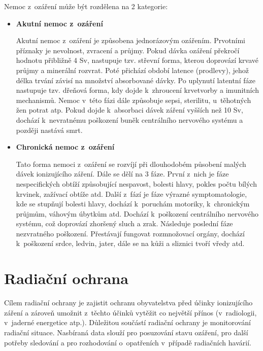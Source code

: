 Nemoc z~ozáření může být rozdělena na 2 kategorie: \cite{nemoc}

\begin{itemize}
	\item \textbf{Akutní nemoc z~ozáření}
	
		Akutní nemoc z~ozáření je způsobena jednorázovým
ozářením. Prvotními příznaky je nevolnost, zvracení a průjmy. Pokud
dávka ozáření překročí hodnotu přibližně 4 Sv, nastupuje tzv. střevní
forma, kterou doprovází krvavé průjmy a minerální rozvrat. Poté
přichází období latence (prodlevy), jehož délka trvání závisí na
množství absorbované dávky. Po uplynutí latentní fáze nastupuje
tzv. dřeňová forma, kdy dojde k~zhroucení krvetvorby a imunitních
mechanismů. Nemoc v~této fázi dále způsobuje sepsi, sterilitu,
u~těhotných žen potrat atp. Pokud dojde k~absorbaci dávek záření
vyšších než 10 Sv, dochází k~nevratnému poškození buněk centrálního
nervového systému a později nastává smrt.
		
	\item \textbf{Chronická nemoc z~ozáření}
	
		Tato forma nemoci z~ozáření se rozvíjí při dlouhodobém
působení malých dávek ionizujícího záření. Dále se dělí na 3
fáze. První z~nich je fáze nespecifických obtíží způsobující
nespavost, bolesti hlavy, pokles počtu bílých krvinek, zažívací obtíže
atd. Další z~fází je fáze výrazné symptomatologie, kde se stupňují
bolesti hlavy, dochází k~poruchám motoriky, k~chronickým průjmům,
váhovým úbytkům atd. Dochází k~poškození centrálního nervového
systému, což doprovází zhoršený sluch a zrak. Následuje poslední fáze
nezvratného poškození. Přestávají fungovat rozmnožovací orgány,
dochází k~poškození srdce, ledvin, jater, dále se na kůži a sliznici
tvoří vředy atd.

\end{itemize}

\section{Radiační ochrana} Cílem radiační ochrany je zajistit ochranu
obyvatelstva před účinky ionizujícího záření a zároveň umožnit
z~těchto účinků vytěžit co největší přínos (v~radiologii, v~jaderné
energetice atp.). Důležitou součástí radiační ochrany je monitorování
radiační situace. Nasbíraná data slouží pro posuzování stavu ozáření,
pro další potřeby sledování a pro rozhodování o~opatřeních v~případě
radiačních havárií. \cite{suroRadOch} \cite{sujbRadSit}

